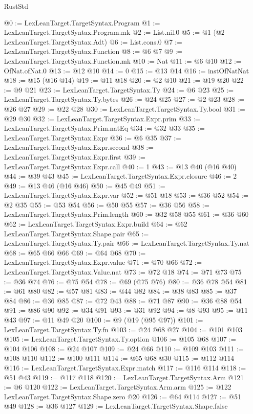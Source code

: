 \begin{lexlean}{RustStd}
\begin{coremodule}
@0 := LexLeanTarget.TargetSyntax.Program
@1 := LexLeanTarget.TargetSyntax.Program.mk
@2 := List.nil.{0}
@5 := @1 (@2 LexLeanTarget.TargetSyntax.Adt)
@6 := List.cons.{0}
@7 := LexLeanTarget.TargetSyntax.Function
@8 := @6 @7
@9 := LexLeanTarget.TargetSyntax.Function.mk
@10 := Nat
@11 := @6 @10
@12 := OfNat.ofNat.{0}
@13 := @12 @10
@14 := 0
@15 := @13 @14
@16 := instOfNatNat
@18 := @15 (@16 @14)
@19 := @11 @18
@20 := @2 @10
@21 := @19 @20
@22 := @9 @21
@23 := LexLeanTarget.TargetSyntax.Ty
@24 := @6 @23
@25 := LexLeanTarget.TargetSyntax.Ty.bytes
@26 := @24 @25
@27 := @2 @23
@28 := @26 @27
@29 := @22 @28
@30 := LexLeanTarget.TargetSyntax.Ty.bool
@31 := @29 @30
@32 := LexLeanTarget.TargetSyntax.Expr.prim
@33 := LexLeanTarget.TargetSyntax.Prim.natEq
@34 := @32 @33
@35 := LexLeanTarget.TargetSyntax.Expr
@36 := @6 @35
@37 := LexLeanTarget.TargetSyntax.Expr.second
@38 := LexLeanTarget.TargetSyntax.Expr.first
@39 := LexLeanTarget.TargetSyntax.Expr.call
@40 := 1
@43 := @13 @40 (@16 @40)
@44 := @39 @43
@45 := LexLeanTarget.TargetSyntax.Expr.closure
@46 := 2
@49 := @13 @46 (@16 @46)
@50 := @45 @49
@51 := LexLeanTarget.TargetSyntax.Expr.var
@52 := @51 @18
@53 := @36 @52
@54 := @2 @35
@55 := @53 @54
@56 := @50 @55
@57 := @36 @56
@58 := LexLeanTarget.TargetSyntax.Prim.length
@60 := @32 @58 @55
@61 := @36 @60
@62 := LexLeanTarget.TargetSyntax.Expr.build
@64 := @62 LexLeanTarget.TargetSyntax.Shape.pair
@65 := LexLeanTarget.TargetSyntax.Ty.pair
@66 := LexLeanTarget.TargetSyntax.Ty.nat
@68 := @65 @66 @66
@69 := @64 @68
@70 := LexLeanTarget.TargetSyntax.Expr.value
@71 := @70 @66
@72 := LexLeanTarget.TargetSyntax.Value.nat
@73 := @72 @18
@74 := @71 @73
@75 := @36 @74
@76 := @75 @54
@78 := @69 (@75 @76)
@80 := @36 @78 @54
@81 := @61 @80
@82 := @57 @81
@83 := @44 @82
@84 := @38 @83
@85 := @37 @84
@86 := @36 @85
@87 := @72 @43
@88 := @71 @87
@90 := @36 @88 @54
@91 := @86 @90
@92 := @34 @91
@93 := @31 @92
@94 := @8 @93
@95 := @11 @43
@97 := @11 @49 @20
@100 := @9 (@19 (@95 @97))
@101 := LexLeanTarget.TargetSyntax.Ty.fn
@103 := @24 @68 @27
@104 := @101 @103
@105 := LexLeanTarget.TargetSyntax.Ty.option
@106 := @105 @68
@107 := @104 @106
@108 := @24 @107
@109 := @24 @66
@110 := @109 @103
@111 := @108 @110
@112 := @100 @111
@114 := @65 @68 @30
@115 := @112 @114
@116 := LexLeanTarget.TargetSyntax.Expr.match
@117 := @116 @114
@118 := @51 @43
@119 := @117 @118
@120 := LexLeanTarget.TargetSyntax.Arm
@121 := @6 @120
@122 := LexLeanTarget.TargetSyntax.Arm.arm
@125 := @122 LexLeanTarget.TargetSyntax.Shape.zero @20
@126 := @64 @114
@127 := @51 @49
@128 := @36 @127
@129 := LexLeanTarget.TargetSyntax.Shape.false

\end{coremodule}
\end{lexlean}
